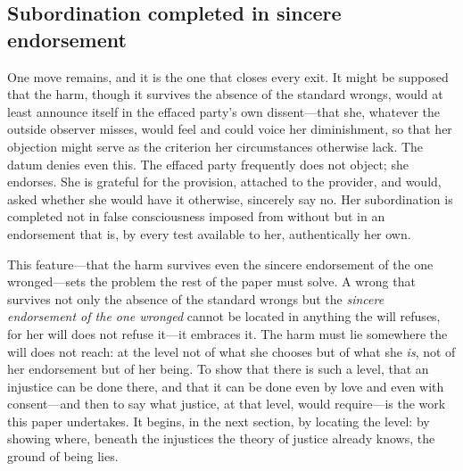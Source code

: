 \subsection{Subordination completed in sincere endorsement}
\label{p18:sub:phen-sincere}

One move remains, and it is the one that closes every exit. It might be supposed that the harm, though it survives the absence of the standard wrongs, would at least announce itself in the effaced party's own dissent---that she, whatever the outside observer misses, would feel and could voice her diminishment, so that her objection might serve as the criterion her circumstances otherwise lack. The datum denies even this. The effaced party frequently does not object; she endorses. She is grateful for the provision, attached to the provider, and would, asked whether she would have it otherwise, sincerely say no. Her subordination is completed not in false consciousness imposed from without but in an endorsement that is, by every test available to her, authentically her own.

This feature---that the harm survives even the sincere endorsement of the one wronged---sets the problem the rest of the paper must solve. A wrong that survives not only the absence of the standard wrongs but the \emph{sincere endorsement of the one wronged} cannot be located in anything the will refuses, for her will does not refuse it---it embraces it. The harm must lie somewhere the will does not reach: at the level not of what she chooses but of what she \emph{is}, not of her endorsement but of her being. To show that there is such a level, that an injustice can be done there, and that it can be done even by love and even with consent---and then to say what justice, at that level, would require---is the work this paper undertakes. It begins, in the next section, by locating the level: by showing where, beneath the injustices the theory of justice already knows, the ground of being lies.
